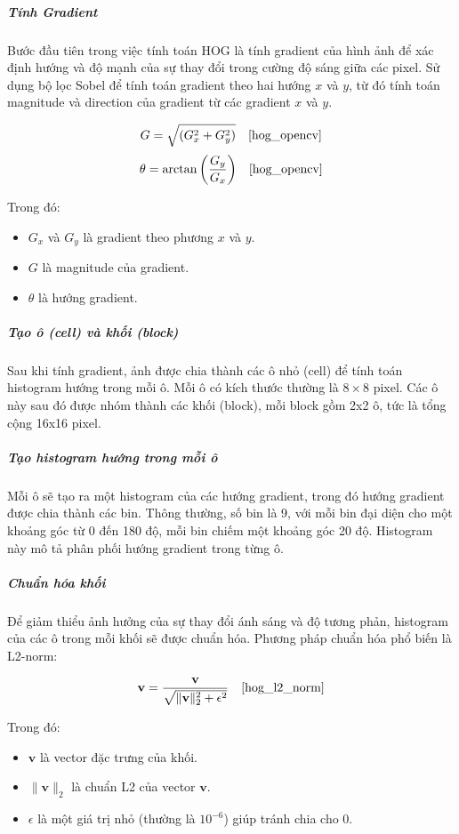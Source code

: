 \documentclass[a4paper,12pt]{article}
\begin{document}
\subparagraph{Tính Gradient}
\hspace{5mm}Bước đầu tiên trong việc tính toán HOG là tính gradient của hình ảnh để xác định hướng và độ mạnh của sự thay đổi trong cường độ sáng giữa các pixel. Sử dụng bộ lọc Sobel để tính toán gradient theo hai hướng \(x\) và \(y\), từ đó tính toán magnitude và direction của gradient từ các gradient \(x\) và \(y\).

\[
G = \sqrt{(G_x^2 + G_y^2)} \quad \text{\cite{hog_opencv}}
\]
\[
\theta = \arctan{\left(\frac{G_y}{G_x}\right)} \quad \text{\cite{hog_opencv}}
\]


\hspace{5mm}Trong đó:
\begin{itemize}
    \item \(G_x\) và \(G_y\) là gradient theo phương \(x\) và \(y\).
    \item \(G\) là magnitude của gradient.
    \item \(\theta\) là hướng gradient.
\end{itemize}

\subparagraph{Tạo ô (cell) và khối (block)}
\hspace{5mm}Sau khi tính gradient, ảnh được chia thành các ô nhỏ (cell) để tính toán histogram hướng trong mỗi ô. Mỗi ô có kích thước thường là \(8 \times 8\) pixel. Các ô này sau đó được nhóm thành các khối (block), mỗi block gồm 2x2 ô, tức là tổng cộng 16x16 pixel.

\subparagraph{Tạo histogram hướng trong mỗi ô}
\hspace{5mm}Mỗi ô sẽ tạo ra một histogram của các hướng gradient, trong đó hướng gradient được chia thành các bin. Thông thường, số bin là 9, với mỗi bin đại diện cho một khoảng góc từ 0 đến 180 độ, mỗi bin chiếm một khoảng góc 20 độ. Histogram này mô tả phân phối hướng gradient trong từng ô.

\subparagraph{Chuẩn hóa khối}
\hspace{5mm}Để giảm thiểu ảnh hưởng của sự thay đổi ánh sáng và độ tương phản, histogram của các ô trong mỗi khối sẽ được chuẩn hóa. Phương pháp chuẩn hóa phổ biến là L2-norm:

\[
\mathbf{v} = \frac{\mathbf{v}}{\sqrt{\|\mathbf{v}\|_2^2 + \epsilon^2}} \quad \text{\cite{hog_l2_norm}}
\]

Trong đó:
\begin{itemize}
    \item \(\mathbf{v}\) là vector đặc trưng của khối.
    \item \(\|\mathbf{v}\|_2\) là chuẩn L2 của vector \(\mathbf{v}\).
    \item \(\epsilon\) là một giá trị nhỏ (thường là \(10^{-6}\)) giúp tránh chia cho 0.
\end{itemize}
\end{document}

